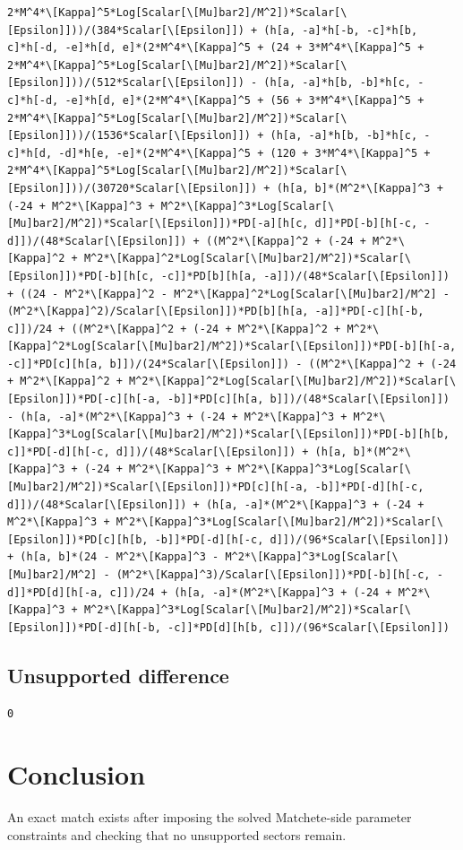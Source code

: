 \documentclass[11pt]{article}
\begin{document}
\begin{verbatim}
2*M^4*\[Kappa]^5*Log[Scalar[\[Mu]bar2]/M^2])*Scalar[\[Epsilon]]))/(384*Scalar[\[Epsilon]]) + (h[a, -a]*h[-b, -c]*h[b, c]*h[-d, -e]*h[d, e]*(2*M^4*\[Kappa]^5 + (24 + 3*M^4*\[Kappa]^5 + 2*M^4*\[Kappa]^5*Log[Scalar[\[Mu]bar2]/M^2])*Scalar[\[Epsilon]]))/(512*Scalar[\[Epsilon]]) - (h[a, -a]*h[b, -b]*h[c, -c]*h[-d, -e]*h[d, e]*(2*M^4*\[Kappa]^5 + (56 + 3*M^4*\[Kappa]^5 + 2*M^4*\[Kappa]^5*Log[Scalar[\[Mu]bar2]/M^2])*Scalar[\[Epsilon]]))/(1536*Scalar[\[Epsilon]]) + (h[a, -a]*h[b, -b]*h[c, -c]*h[d, -d]*h[e, -e]*(2*M^4*\[Kappa]^5 + (120 + 3*M^4*\[Kappa]^5 + 2*M^4*\[Kappa]^5*Log[Scalar[\[Mu]bar2]/M^2])*Scalar[\[Epsilon]]))/(30720*Scalar[\[Epsilon]]) + (h[a, b]*(M^2*\[Kappa]^3 + (-24 + M^2*\[Kappa]^3 + M^2*\[Kappa]^3*Log[Scalar[\[Mu]bar2]/M^2])*Scalar[\[Epsilon]])*PD[-a][h[c, d]]*PD[-b][h[-c, -d]])/(48*Scalar[\[Epsilon]]) + ((M^2*\[Kappa]^2 + (-24 + M^2*\[Kappa]^2 + M^2*\[Kappa]^2*Log[Scalar[\[Mu]bar2]/M^2])*Scalar[\[Epsilon]])*PD[-b][h[c, -c]]*PD[b][h[a, -a]])/(48*Scalar[\[Epsilon]]) + ((24 - M^2*\[Kappa]^2 - M^2*\[Kappa]^2*Log[Scalar[\[Mu]bar2]/M^2] - (M^2*\[Kappa]^2)/Scalar[\[Epsilon]])*PD[b][h[a, -a]]*PD[-c][h[-b, c]])/24 + ((M^2*\[Kappa]^2 + (-24 + M^2*\[Kappa]^2 + M^2*\[Kappa]^2*Log[Scalar[\[Mu]bar2]/M^2])*Scalar[\[Epsilon]])*PD[-b][h[-a, -c]]*PD[c][h[a, b]])/(24*Scalar[\[Epsilon]]) - ((M^2*\[Kappa]^2 + (-24 + M^2*\[Kappa]^2 + M^2*\[Kappa]^2*Log[Scalar[\[Mu]bar2]/M^2])*Scalar[\[Epsilon]])*PD[-c][h[-a, -b]]*PD[c][h[a, b]])/(48*Scalar[\[Epsilon]]) - (h[a, -a]*(M^2*\[Kappa]^3 + (-24 + M^2*\[Kappa]^3 + M^2*\[Kappa]^3*Log[Scalar[\[Mu]bar2]/M^2])*Scalar[\[Epsilon]])*PD[-b][h[b, c]]*PD[-d][h[-c, d]])/(48*Scalar[\[Epsilon]]) + (h[a, b]*(M^2*\[Kappa]^3 + (-24 + M^2*\[Kappa]^3 + M^2*\[Kappa]^3*Log[Scalar[\[Mu]bar2]/M^2])*Scalar[\[Epsilon]])*PD[c][h[-a, -b]]*PD[-d][h[-c, d]])/(48*Scalar[\[Epsilon]]) + (h[a, -a]*(M^2*\[Kappa]^3 + (-24 + M^2*\[Kappa]^3 + M^2*\[Kappa]^3*Log[Scalar[\[Mu]bar2]/M^2])*Scalar[\[Epsilon]])*PD[c][h[b, -b]]*PD[-d][h[-c, d]])/(96*Scalar[\[Epsilon]]) + (h[a, b]*(24 - M^2*\[Kappa]^3 - M^2*\[Kappa]^3*Log[Scalar[\[Mu]bar2]/M^2] - (M^2*\[Kappa]^3)/Scalar[\[Epsilon]])*PD[-b][h[-c, -d]]*PD[d][h[-a, c]])/24 + (h[a, -a]*(M^2*\[Kappa]^3 + (-24 + M^2*\[Kappa]^3 + M^2*\[Kappa]^3*Log[Scalar[\[Mu]bar2]/M^2])*Scalar[\[Epsilon]])*PD[-d][h[-b, -c]]*PD[d][h[b, c]])/(96*Scalar[\[Epsilon]])
\end{verbatim}
\subsection{Unsupported difference}
\begin{verbatim}
0
\end{verbatim}
\section{Conclusion}
An exact match exists after imposing the solved Matchete-side parameter constraints and checking that no unsupported sectors remain.
\end{document}
